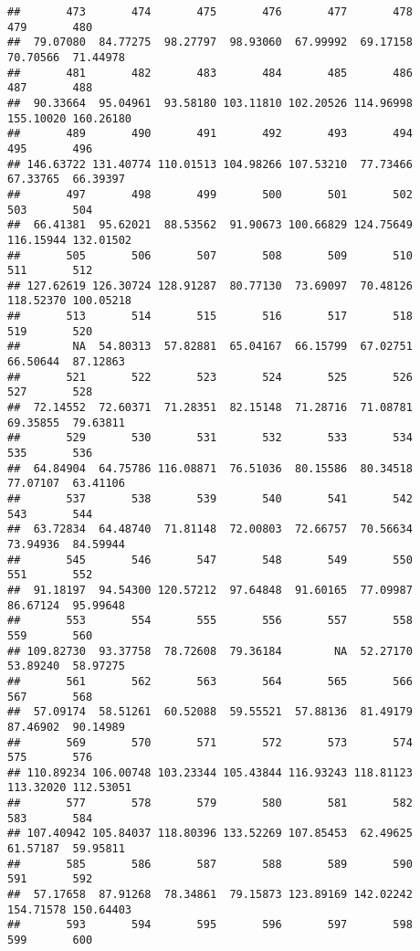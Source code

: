 \documentclass[
]{article}
\begin{document}
\begin{verbatim}
##       473       474       475       476       477       478       479       480 
##  79.07080  84.77275  98.27797  98.93060  67.99992  69.17158  70.70566  71.44978 
##       481       482       483       484       485       486       487       488 
##  90.33664  95.04961  93.58180 103.11810 102.20526 114.96998 155.10020 160.26180 
##       489       490       491       492       493       494       495       496 
## 146.63722 131.40774 110.01513 104.98266 107.53210  77.73466  67.33765  66.39397 
##       497       498       499       500       501       502       503       504 
##  66.41381  95.62021  88.53562  91.90673 100.66829 124.75649 116.15944 132.01502 
##       505       506       507       508       509       510       511       512 
## 127.62619 126.30724 128.91287  80.77130  73.69097  70.48126 118.52370 100.05218 
##       513       514       515       516       517       518       519       520 
##        NA  54.80313  57.82881  65.04167  66.15799  67.02751  66.50644  87.12863 
##       521       522       523       524       525       526       527       528 
##  72.14552  72.60371  71.28351  82.15148  71.28716  71.08781  69.35855  79.63811 
##       529       530       531       532       533       534       535       536 
##  64.84904  64.75786 116.08871  76.51036  80.15586  80.34518  77.07107  63.41106 
##       537       538       539       540       541       542       543       544 
##  63.72834  64.48740  71.81148  72.00803  72.66757  70.56634  73.94936  84.59944 
##       545       546       547       548       549       550       551       552 
##  91.18197  94.54300 120.57212  97.64848  91.60165  77.09987  86.67124  95.99648 
##       553       554       555       556       557       558       559       560 
## 109.82730  93.37758  78.72608  79.36184        NA  52.27170  53.89240  58.97275 
##       561       562       563       564       565       566       567       568 
##  57.09174  58.51261  60.52088  59.55521  57.88136  81.49179  87.46902  90.14989 
##       569       570       571       572       573       574       575       576 
## 110.89234 106.00748 103.23344 105.43844 116.93243 118.81123 113.32020 112.53051 
##       577       578       579       580       581       582       583       584 
## 107.40942 105.84037 118.80396 133.52269 107.85453  62.49625  61.57187  59.95811 
##       585       586       587       588       589       590       591       592 
##  57.17658  87.91268  78.34861  79.15873 123.89169 142.02242 154.71578 150.64403 
##       593       594       595       596       597       598       599       600 

\end{verbatim}
\end{document}
